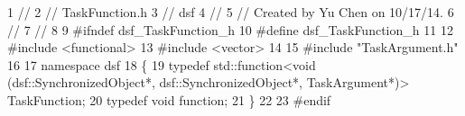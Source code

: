 \begin{DoxyCodeInclude}
1 \textcolor{comment}{//}
2 \textcolor{comment}{//  TaskFunction.h}
3 \textcolor{comment}{//  dsf}
4 \textcolor{comment}{//}
5 \textcolor{comment}{//  Created by Yu Chen on 10/17/14.}
6 \textcolor{comment}{//}
7 \textcolor{comment}{//}
8 
9 \textcolor{preprocessor}{#ifndef dsf\_TaskFunction\_h}
10 \textcolor{preprocessor}{#define dsf\_TaskFunction\_h}
11 
12 \textcolor{preprocessor}{#include <functional>}
13 \textcolor{preprocessor}{#include <vector>}
14 
15 \textcolor{preprocessor}{#include "TaskArgument.h"}
16 
17 \textcolor{keyword}{namespace }dsf
18 \{
19     \textcolor{keyword}{typedef} std::function<void (dsf::SynchronizedObject*, dsf::SynchronizedObject*, TaskArgument*)> 
      TaskFunction;
20     \textcolor{keyword}{typedef} \textcolor{keywordtype}{void} \textcolor{keyword}{function};
21 \}
22 
23 \textcolor{preprocessor}{#endif}
\end{DoxyCodeInclude}
 